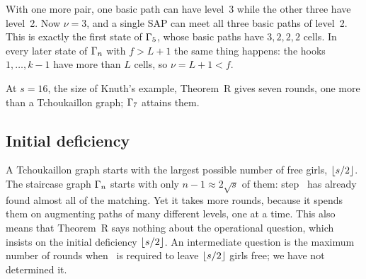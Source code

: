 With one more pair, one basic path can have level~3 while the other three
have level~2. Now $\nu=3$, and a single SAP can meet all three basic paths
of level~2. This is exactly the first state of $\Gamma_5$, whose basic paths
have $3,2,2,2$ cells. In every later state of $\Gamma_n$ with $f>L+1$ the
same thing happens: the hooks~$1,\ldots,k-1$ have more than $L$ cells, so
$\nu=L+1<f$.

At $s=16$, the size of Knuth's example, Theorem~R gives seven rounds,
one more than a Tchoukaillon graph; $\Gamma_7$ attains them.

\subsection{Initial deficiency}

A Tchoukaillon graph starts with the largest possible number of free
girls, $\lfloor s/2\rfloor$. The staircase graph $\Gamma_n$ starts with only
$n-1\approx2\sqrt s$ of them: step~ has already found almost all of
the matching. Yet it takes more rounds, because it spends them on
augmenting paths of many different levels, one at a time. This also means that
Theorem~R says nothing about the operational question, which insists on
the initial deficiency $\lfloor s/2\rfloor$. An intermediate question is
the maximum number of rounds when~ is required to leave $\lfloor s/2\rfloor$
girls free; we have not determined it.

